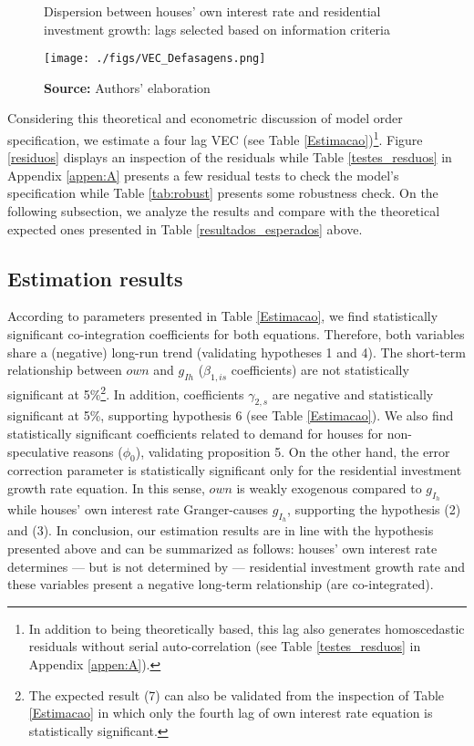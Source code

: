 \documentclass[12pt, a4]{article}
\begin{document}
\begin{figure}
	\centering
	\caption{Dispersion between houses' own interest rate and residential investment growth: lags selected based on information criteria}
	\label{defasagens}
	\texttt{[image: ./figs/VEC\_Defasagens.png]}
	\caption*{\textbf{Source:} Authors' elaboration}
\end{figure}

Considering this theoretical and econometric discussion of model order specification, we estimate a four lag VEC  (see Table \ref{Estimacao})\footnote{In addition to being theoretically based, this lag also generates homoscedastic residuals without serial auto-correlation (see Table \ref{testes_resduos} in Appendix \ref{appen:A}).}. 
Figure \ref{residuos} displays an inspection of the residuals while Table \ref{testes_resduos} in Appendix \ref{appen:A} presents a few residual tests to check the model's specification while Table \ref{tab:robust} presents some robustness check.
On the following subsection, we analyze the results and compare with the theoretical expected ones presented in Table \ref{resultados_esperados} above.  




\subsection{Estimation results}
\label{sec:org284a0fd}
\label{sec:results}

According to parameters presented in Table \ref{Estimacao}, we find statistically significant co-integration  coefficients for both equations. 
Therefore, both variables share a (negative) long-run trend (validating hypotheses 1 and 4).
The short-term relationship between \(own\) and \(g_{Ih}\) (\(\beta_{1, is}\) coefficients) are not statistically significant at 5\%\footnote{The expected result (7) can also be validated from the inspection of Table \ref{Estimacao} in which only the fourth lag of own interest rate equation is statistically significant.}.
In addition, coefficients \(\gamma_{2,s}\) are negative and statistically significant at 5\%, supporting hypothesis 6 (see Table  \ref{Estimacao}).
We also find statistically significant coefficients related to demand for houses for non-speculative reasons (\(\phi_0\)), validating proposition 5.
On the other hand, the error correction parameter is statistically significant only for the residential investment growth rate equation.
In this sense, \(own\) is weakly exogenous compared to \(g_{I_h}\) while houses' own interest rate Granger-causes \(g_{I_h}\), supporting the hypothesis (2) and (3).
In conclusion, our estimation results are in line with the hypothesis presented above and can be summarized as follows: houses' own interest rate determines --- but is not determined by --- residential investment growth rate and these variables present a negative long-term relationship (are co-integrated).
\end{document}
